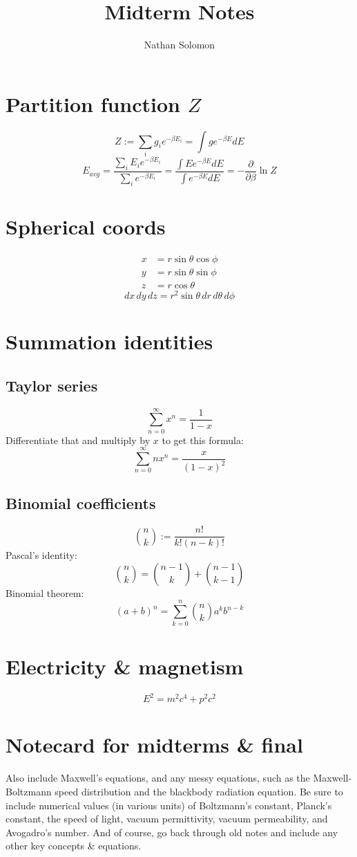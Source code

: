 \documentclass[12pt]{article}
\begin{document}
\title{Midterm Notes}
\author{Nathan Solomon}
\maketitle

\section{Partition function $Z$}
\[ Z := \sum_i g_i e^{-\beta E_i} = \int g e^{- \beta E} dE \]
\[E_{avg} = \frac{\sum_i E_i e^{-\beta E_i}}{\sum_i e^{-\beta E_i}} = \frac{\int E e^{-\beta E} dE}{\int e^{-\beta E} dE}  = - \frac{\partial}{\partial \beta} \ln Z\]

\section{Spherical coords}
\begin{align*}
    x &= r \sin \theta \cos \phi \\
    y &= r \sin \theta \sin \phi \\
    z &= r \cos \theta
\end{align*}
\[dx \, dy \, dz = r^2 \sin \theta \, dr \, d\theta \, d\phi\]

\section{Summation identities}
\subsection{Taylor series}
\[\sum_{n=0}^\infty x^n = \frac{1}{1-x} \]
Differentiate that and multiply by $x$ to get this formula:
\[\sum_{n=0}^\infty nx^n = \frac{x}{(1-x)^2} \]

\subsection{Binomial coefficients}
\[ \binom{n}{k} := \frac{n!}{k! (n-k)!} \]
Pascal's identity:
\[\binom{n}{k} = \binom{n-1}{k} + \binom{n-1}{k-1}\]
Binomial theorem:
\[(a+b)^n = \sum_{k=0}^n \binom{n}{k} a^k b^{n-k}\]


\section{Electricity \& magnetism}

\[E^2 = m^2 c^4 + p^2 c^2\]

\section{Notecard for midterms \& final}
Also include Maxwell's equations, and any messy equations, such as the Maxwell-Boltzmann speed distribution and the blackbody radiation equation. Be sure to include numerical values (in various units) of Boltzmann's constant, Planck's constant, the speed of light, vacuum permittivity, vacuum permeability, and Avogadro's number. And of course, go back through old notes and include any other key concepts \& equations.
\end{document}
